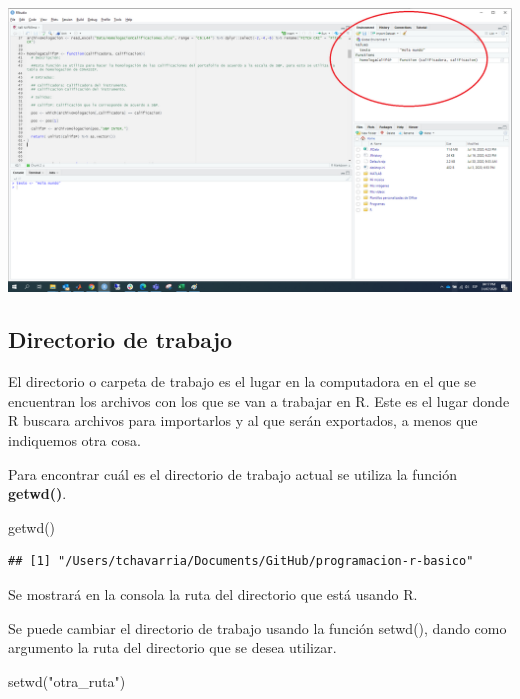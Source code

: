 \documentclass[
  12pt,
]{book}
\newenvironment{Shaded}{\begin{snugshade}}{\end{snugshade}}
\newcommand{\FunctionTok}[1]{\textcolor[rgb]{0.00,0.00,0.00}{#1}}
\newcommand{\NormalTok}[1]{#1}
\newcommand{\StringTok}[1]{\textcolor[rgb]{0.31,0.60,0.02}{#1}}
\begin{document}
\begin{center}\includegraphics[width=1\linewidth]{images/entorno} \end{center}

\hypertarget{directorio-de-trabajo}{%
\subsection{\texorpdfstring{\textbf{Directorio de trabajo}}{Directorio de trabajo}}\label{directorio-de-trabajo}}

El directorio o carpeta de trabajo es el lugar en la computadora en el que se encuentran los archivos con los que se van a trabajar en R. Este es el lugar donde R buscara archivos para importarlos y al que serán exportados, a menos que indiquemos otra cosa.

Para encontrar cuál es el directorio de trabajo actual se utiliza la función \textbf{getwd()}.

\begin{Shaded}
\begin{Highlighting}[]
\FunctionTok{getwd}\NormalTok{()}
\end{Highlighting}
\end{Shaded}

\begin{verbatim}
## [1] "/Users/tchavarria/Documents/GitHub/programacion-r-basico"
\end{verbatim}

Se mostrará en la consola la ruta del directorio que está usando R.

Se puede cambiar el directorio de trabajo usando la función setwd(), dando como argumento la ruta del directorio que se desea utilizar.

\begin{Shaded}
\begin{Highlighting}[]
\FunctionTok{setwd}\NormalTok{(}\StringTok{"otra\_ruta"}\NormalTok{)}
\end{Highlighting}
\end{Shaded}
\end{document}
